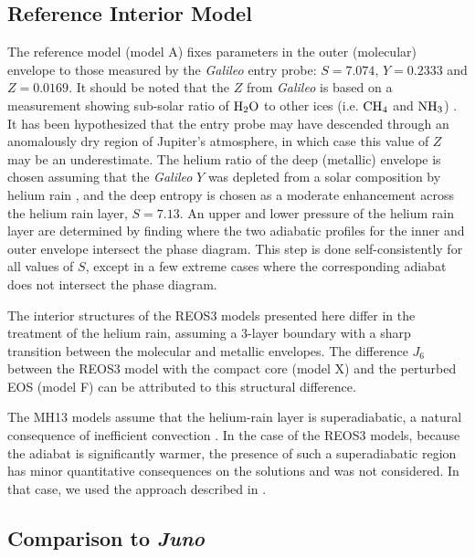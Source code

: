 \subsection{Reference Interior Model}

The reference model (model A) fixes parameters in the outer (molecular) envelope to those
measured by the \textit{Galileo} entry probe: $S=7.074$, $Y=0.2333$ and $Z=0.0169$.
It should be noted that the $Z$ from \textit{Galileo} is based on a measurement
showing sub-solar ratio of ${\rm H}_2{\rm O}$ to other ices (i.e. ${\rm CH}_4$ and
${\rm NH}_3$) \citep{Wong2004}. It has been hypothesized that the entry probe may
have descended through an anomalously dry region of Jupiter's atmosphere, in which
case this value of $Z$ may be an underestimate. The helium ratio of the deep
(metallic) envelope is chosen assuming that the \textit{Galileo} $Y$ was depleted
from a solar composition by helium rain , and the deep entropy is chosen as a
moderate enhancement across the helium rain layer, $S=7.13$.  An upper and lower
pressure of the helium rain layer are determined by finding where the two adiabatic
profiles for the inner and outer envelope intersect the \citep{morales2013} phase
diagram. This step is done self-consistently for all values of $S$, except in a few
extreme cases where the corresponding adiabat does not intersect the phase diagram. 

The interior structures of the REOS3 models presented here differ in the treatment of
the helium rain, assuming a 3-layer boundary with a sharp transition between the
molecular and metallic envelopes. The difference $J_6$ between the REOS3 model with
the compact core (model X) and the perturbed EOS (model F) can be attributed to this
structural difference. 

The MH13 models assume that the helium-rain layer is
superadiabatic, a natural consequence of inefficient convection
\citep{militzer2016}. In the case of the REOS3 models, because the adiabat is
significantly warmer, the presence of such a superadiabatic region has minor
quantitative consequences on the solutions and was not considered. In that
case, we used the approach described in \citet{miguel2016}.  

\subsection{Comparison to \textit{Juno}} \label{sec:comparison}

